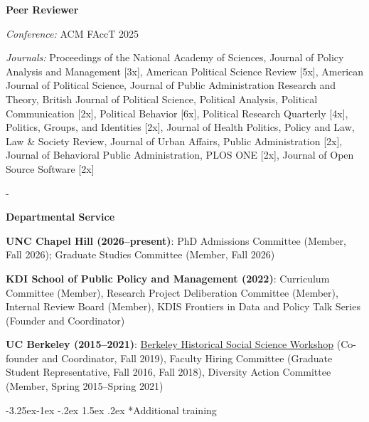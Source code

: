 \documentclass[10pt, letterpaper]{article}
\makeatletter
\newcommand{\needspace}[1]{%
  \par\penalty-100\begingroup
  \setlength{\dimen@}{#1}%
  \dimen@ii\pagegoal \advance\dimen@ii-\pagetotal
  \ifdim\dimen@>\dimen@ii \break\fi
  \endgroup
}
\renewcommand\subsection{\@startsection{subsection}{2}{\z@}%
  {-3.25ex\@plus -1ex \@minus -.2ex}%
  {1.5ex \@plus .2ex}%
  {\normalfont\large\bfseries\color{cvnavy}}}
\renewenvironment{itemize}{
\begin{list}{}{
        \setlength{\leftmargin}{1.5em}
        \setlength{\itemsep}{0.10em}
        \setlength{\parskip}{0pt}
        \setlength{\parsep}{0.10em}
    }
}{
\end{list}
}
\makeatother
\begin{document}
\begin{itemize}
\item \textbf{Peer Reviewer}  

\begin{itemize}
  \item \textit{Conference:} ACM FAccT 2025  
  \item \textit{Journals:}
Proceedings of the National Academy of Sciences, Journal of Policy Analysis and Management [3x], American Political Science Review [5x], American Journal of Political Science, Journal of Public Administration Research and Theory, British Journal of Political Science, Political Analysis, Political Communication [2x], Political Behavior [6x], Political Research Quarterly [4x], Politics, Groups, and Identities [2x], Journal of Health Politics, Policy and Law, Law \& Society Review, Journal of Urban Affairs, Public Administration [2x], Journal of Behavioral Public Administration, PLOS ONE [2x], Journal of Open Source Software [2x]

\end{itemize}

\end{itemize}

\vspace{0.5em}

\needspace{5\baselineskip}
\textbf{Departmental Service}

\begin{itemize}

  \item \textbf{UNC Chapel Hill (2026--present)}: PhD Admissions Committee (Member, Fall 2026); Graduate Studies Committee (Member, Fall 2026)
  
  \item \textbf{KDI School of Public Policy and Management (2022)}: Curriculum Committee (Member), Research Project Deliberation Committee (Member), Internal Review Board (Member), KDIS Frontiers in Data and Policy Talk Series (Founder and Coordinator)

  \item \textbf{UC Berkeley (2015--2021)}: \href{https://github.com/ottokienitz/hssw?tab=readme-ov-file}{Berkeley Historical Social Science Workshop} (Co-founder and Coordinator, Fall 2019), Faculty Hiring Committee (Graduate Student Representative, Fall 2016, Fall 2018), Diversity Action Committee (Member, Spring 2015--Spring 2021)
  
  \end{itemize}


\subsection*{Additional training}
\end{document}
